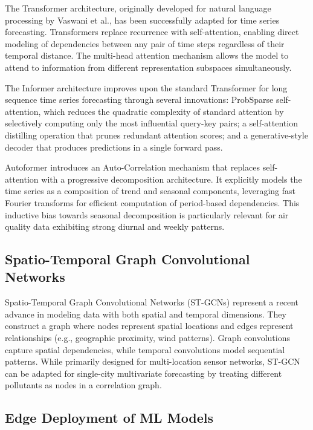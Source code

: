 The Transformer architecture, originally developed for natural language processing by Vaswani et al., has been successfully adapted for time series forecasting. Transformers replace recurrence with self-attention, enabling direct modeling of dependencies between any pair of time steps regardless of their temporal distance. The multi-head attention mechanism allows the model to attend to information from different representation subspaces simultaneously.

The Informer architecture improves upon the standard Transformer for long sequence time series forecasting through several innovations: ProbSparse self-attention, which reduces the quadratic complexity of standard attention by selectively computing only the most influential query-key pairs; a self-attention distilling operation that prunes redundant attention scores; and a generative-style decoder that produces predictions in a single forward pass.

Autoformer introduces an Auto-Correlation mechanism that replaces self-attention with a progressive decomposition architecture. It explicitly models the time series as a composition of trend and seasonal components, leveraging fast Fourier transforms for efficient computation of period-based dependencies. This inductive bias towards seasonal decomposition is particularly relevant for air quality data exhibiting strong diurnal and weekly patterns.

\subsection{Spatio-Temporal Graph Convolutional Networks}

Spatio-Temporal Graph Convolutional Networks (ST-GCNs) represent a recent advance in modeling data with both spatial and temporal dimensions. They construct a graph where nodes represent spatial locations and edges represent relationships (e.g., geographic proximity, wind patterns). Graph convolutions capture spatial dependencies, while temporal convolutions model sequential patterns. While primarily designed for multi-location sensor networks, ST-GCN can be adapted for single-city multivariate forecasting by treating different pollutants as nodes in a correlation graph.

\subsection{Edge Deployment of ML Models}

